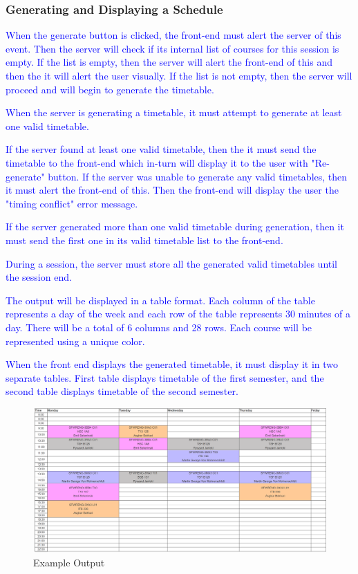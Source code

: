 \documentclass[12pt]{article}
\begin{document}
\subsubsection{Generating and Displaying a Schedule}

\begin{enumerate}
    \item \textcolor{blue}{When the generate button is clicked, the front-end must alert the server of this event. Then the server will check if its internal list of courses for this session is empty. If the list is empty, then the server will alert the front-end of this and then the it will alert the user visually. If the list is not empty, then the server will proceed and will begin to generate the timetable.}
    \item \textcolor{blue}{When the server is generating a timetable, it must attempt to generate at least one valid timetable.
    \item If the server found at least one valid timetable, then the it must send the timetable to the front-end which in-turn will display it to the user with "Re-generate" button. If the server was unable to generate any valid timetables, then it must alert the front-end of this. Then the front-end will display the user the "timing conflict" error message.
    \item If the server generated more than one valid timetable during generation, then it must send the first one in its valid timetable list to the front-end.
    \item During a session, the server must store all the generated valid timetables until the session end.
	\item The output will be displayed in a table format. Each column of the table represents a day of the week and each row of the table represents 30 minutes of a day. There will be a total of 6 columns and 28 rows. Each course will be represented using a unique color.
    \item When the front end displays the generated timetable, it must display it in two separate tables. First table displays timetable of the first semester, and the second table displays timetable of the second semester.}
\end{enumerate}

\begin{figure}[h]
    \centering
    \includegraphics[width=170mm]{Capture.PNG}
    \caption{Example Output}
    \label{fig:my_label}
\end{figure}
\end{document}
